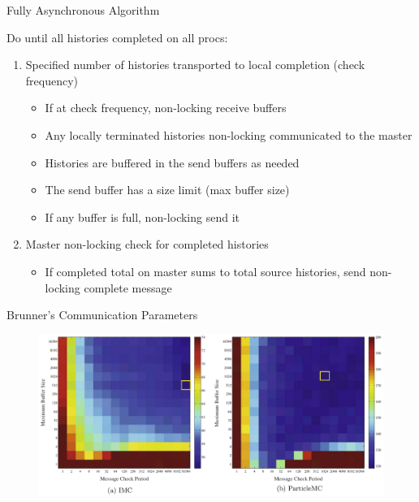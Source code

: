 \documentclass{beamer}
\begin{document}
\begin{frame}{Fully Asynchronous Algorithm}

  Do until all histories completed on all procs:

  \begin{enumerate}
  \item Specified number of histories transported to local completion
    (check frequency)
    \begin{itemize}
    \item If at check frequency, non-locking receive buffers
    \item Any locally terminated histories non-locking communicated to
      the master
    \item Histories are buffered in the send buffers as needed
    \item The send buffer has a size limit (max buffer size)
    \item If any buffer is full, non-locking send it
    \end{itemize}
    \medskip
  \item Master non-locking check for completed histories
    \begin{itemize}
    \item If completed total on master sums to total source
      histories, send non-locking complete message
    \end{itemize}
  \end{enumerate}

\end{frame}

\begin{frame}{Brunner's Communication Parameters}

  \begin{figure}[h!]
    \begin{center}
      \includegraphics[width=5in]{brunner_params.png}
    \end{center}
  \end{figure}

\end{frame}
\end{document}
